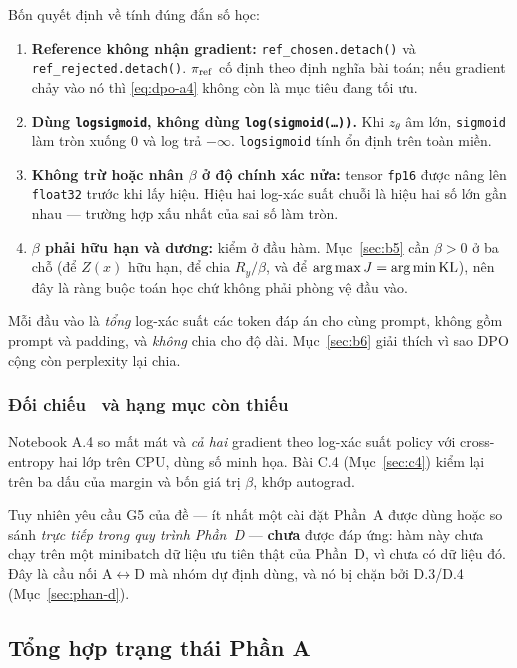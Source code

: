 Bốn quyết định về tính đúng đắn số học:

\begin{enumerate}[leftmargin=2em]
\item \textbf{Reference không nhận gradient:} \texttt{ref\_chosen.detach()} và
\texttt{ref\_rejected.detach()}. $\pi_{\mathrm{ref}}$ cố định theo định nghĩa bài toán; nếu
gradient chảy vào nó thì \eqref{eq:dpo-a4} không còn là mục tiêu đang tối ưu.
\item \textbf{Dùng \texttt{logsigmoid}, không dùng \texttt{log(sigmoid(\ldots))}.}
Khi $z_\theta$ âm lớn, \texttt{sigmoid} làm tròn xuống $0$ và log trả $-\infty$.
\texttt{logsigmoid} tính ổn định trên toàn miền.
\item \textbf{Không trừ hoặc nhân $\beta$ ở độ chính xác nửa:} tensor \texttt{fp16}
được nâng lên \texttt{float32} trước khi lấy hiệu. Hiệu hai log-xác suất chuỗi là
hiệu hai số lớn gần nhau --- trường hợp xấu nhất của sai số làm tròn.
\item \textbf{$\beta$ phải hữu hạn và dương:} kiểm ở đầu hàm.
Mục~\ref{sec:b5} cần $\beta>0$ ở ba chỗ (để $Z(x)$ hữu hạn, để chia $R_y/\beta$,
và để $\operatorname*{arg\,max} J=\operatorname*{arg\,min}\operatorname{KL}$), nên đây là ràng buộc toán học chứ không phải phòng
vệ đầu vào.
\end{enumerate}

Mỗi đầu vào là \emph{tổng} log-xác suất các token đáp án cho cùng prompt, không
gồm prompt và padding, và \emph{không} chia cho độ dài. Mục~\ref{sec:b6} giải thích
vì sao DPO cộng còn perplexity lại chia.

\subsubsection{Đối chiếu \dalam\ và hạng mục còn thiếu \chualam}

Notebook A.4 so mất mát và \emph{cả hai} gradient theo log-xác suất policy với
cross-entropy hai lớp trên CPU, dùng số minh họa. Bài C.4
(Mục~\ref{sec:c4}) kiểm lại trên ba dấu của margin và bốn giá trị $\beta$, khớp
autograd.

Tuy nhiên yêu cầu G5 của đề --- ít nhất một cài đặt Phần~A được dùng hoặc so sánh
\emph{trực tiếp trong quy trình Phần~D} --- \textbf{chưa} được đáp ứng: hàm này
chưa chạy trên một minibatch dữ liệu ưu tiên thật của Phần~D, vì chưa có dữ liệu
đó. Đây là cầu nối A$\leftrightarrow$D mà nhóm dự định dùng, và nó bị chặn bởi
D.3/D.4 (Mục~\ref{sec:phan-d}).

\subsection{Tổng hợp trạng thái Phần A}

